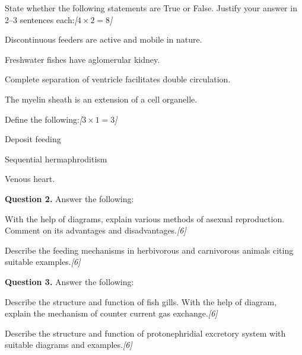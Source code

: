 \documentclass[11pt,a4paper]{article}
\newcommand{\pts}[1]{\hfill   \textit{[#1]}}
\begin{document}
\begin{parts}
  \item State whether the following statements are True or False. Justify your answer in 2--3 sentences each:\pts{$4  \times 2 = 8$}
  
\begin{parts}
    \item Discontinuous feeders are active and mobile in nature.
    \item Freshwater fishes have aglomerular kidney.
    \item Complete separation of ventricle facilitates double circulation.
    \item The myelin sheath is an extension of a cell organelle.
  \end{parts}
  
  \item Define the following:\pts{$3  \times 1 = 3$}
  
\begin{parts}
    \item Deposit feeding
    \item Sequential hermaphroditism
    \item Venous heart.
  \end{parts}
\end{parts}

\medskip


\noindent   \textbf{Question 2.} Answer the following:

\begin{parts}
  \item With the help of diagrams, explain various methods of asexual reproduction. Comment on its advantages and disadvantages.\pts{6}
  \item Describe the feeding mechanisms in herbivorous and carnivorous animals citing suitable examples.\pts{6}
\end{parts}

\medskip


\noindent   \textbf{Question 3.} Answer the following:

\begin{parts}
  \item Describe the structure and function of fish gills. With the help of diagram, explain the mechanism of counter current gas exchange.\pts{6}
  \item Describe the structure and function of protonephridial excretory system with suitable diagrams and examples.\pts{6}
\end{parts}
\end{document}
